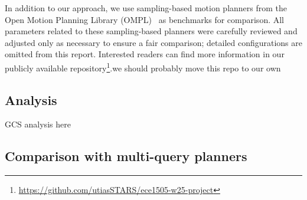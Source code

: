 In addition to our approach, we use sampling-based motion planners from the Open Motion Planning Library (OMPL)~\cite{sucan2012open} as benchmarks for comparison.
All parameters related to these sampling-based planners were carefully reviewed and adjusted only as necessary to ensure a fair comparison; detailed configurations are omitted from this report.
Interested readers can find more information in our publicly available repository\footnote{\url{https://github.com/utiasSTARS/ece1505-w25-project}}.{\color{red}we should probably move this repo to our own}

\subsection{Analysis}
GCS analysis here

\subsection{Comparison with multi-query planners}


